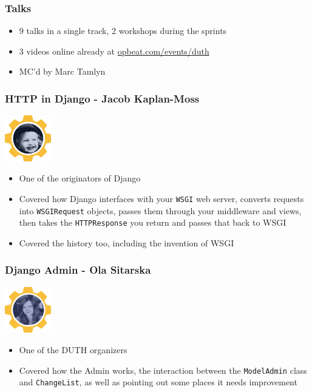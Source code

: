 \documentclass{beamer}
\begin{document}
\begin{frame}[fragile]\frametitle{Talks}

    \begin{itemize}
        \item 9 talks in a single track, 2 workshops during the sprints
        \item 3 videos online already at \url{opbeat.com/events/duth}
        \item MC'd by Marc Tamlyn
    \end{itemize}

\end{frame}


\begin{frame}[fragile]\frametitle{HTTP in Django - Jacob Kaplan-Moss}

    \begin{center}
        \includegraphics[width=2cm]{speaker-jacob}
    \end{center}

    \begin{itemize}
        \item One of the originators of Django
        \item Covered how Django interfaces with your \texttt{WSGI} web server, converts requests into \texttt{WSGIRequest} objects, passes them through your middleware and views, then takes the \texttt{HTTPResponse} you return and passes that back to WSGI
        \item Covered the history too, including the invention of WSGI
    \end{itemize}

\end{frame}


\begin{frame}[fragile]\frametitle{Django Admin - Ola Sitarska}

    \begin{center}
        \includegraphics[width=2cm]{speaker-ola}
    \end{center}

    \begin{itemize}
        \item One of the DUTH organizers
        \item Covered how the Admin works, the interaction between the \texttt{ModelAdmin} class and \texttt{ChangeList}, as well as pointing out some places it needs improvement
    \end{itemize}

\end{frame}
\end{document}
